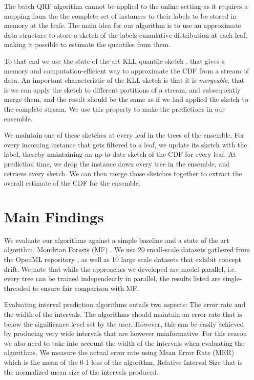 The batch QRF algorithm cannot be applied to the online setting as it requires
a mapping from the the complete set of instances to their labels to be stored
in memory at the leafs. The main idea for our algorithm is to use an approximate data
structure to store a sketch of the labels cumulative distribution at each leaf,
making it possible to estimate the quantiles from them.

To that end we use the state-of-the-art KLL quantile sketch \cite{karnin2016kll},
that gives a memory and computation-efficient way to approximate the CDF from
a stream of data. An important characteristic of the KLL sketch is that it is
\emph{mergeable}, that is we can apply the sketch to different partitions of
a stream, and subsequently merge them, and the result should be the same
as if we had applied the sketch to the complete stream. We use this property
to make the predictions in our ensemble.

We maintain  one of these sketches at every leaf in the trees of the ensemble.
For every incoming instance that gets filtered to a leaf, we update its sketch
with the label, thereby maintaining an up-to-date sketch of the CDF for every
leaf. At prediction time, we drop the instance
down every tree in the ensemble, and retrieve every sketch.
We can then merge those sketches together to extract the overall estimate
of the CDF for the ensemble.

\section{Main Findings}
\label{sec:uncertain-trees-results}

We evaluate our algorithms against a simple baseline and a state of the art
algorithm, Mondrian Forests (MF) \cite{mondrian-forests-original}. We use 20 small-scale
datasets gathered from the OpenML repository \cite{vanschoren2013openml}, as well
as 10 large scale datasets that exhibit concept drift. We note that while the approaches we developed are model-parallel, i.e.
every tree can be trained independently in parallel, the results listed are single-threaded
to ensure fair comparison with MF.

Evaluating interval prediction algorithms entails two aspects: The error rate
and the width of the intervals. The algorithms should maintain an error rate
that is below the significance level set by the user. However, this can be
easily achieved by producing very wide intervals that are however uninformative.
For this reason we also need to take into account the width of  the intervals when
evaluating the algorithms. We measure the actual error rate using Mean Error Rate (MER)
which is the mean of the 0-1 loss of the algorithm, Relative Interval Size that
is the normalized mean size of the intervals produced.

